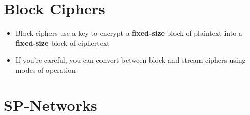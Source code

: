 \documentclass{article}
\begin{document}
\tableofcontents

\newpage

\section{Block Ciphers}
\begin{itemize}
  \item Block ciphers use a key to encrypt a \textbf{fixed-size} block of plaintext into a \textbf{fixed-size} block of ciphertext 
  \item If you’re careful, you can convert between block and stream ciphers using modes of operation
\end{itemize}

\section{SP-Networks}
\end{document}
